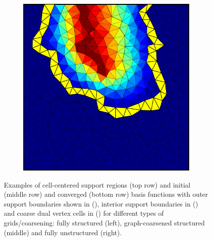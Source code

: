 \begin{figure}[htbp]
\begin{subfigure}[t]{0.3\textwidth}
  \end{subfigure}
  \hfill
  \begin{subfigure}[t]{0.3\textwidth}
    \centerline{\includegraphics[width=0.9\linewidth]{figs/square/square_tria_metis_cell_conv}}
  \end{subfigure}
  \caption[Cell-centered support and basis function examples]{\label{fig:square_cell_basis} Examples of cell-centered support regions (top row) and initial (middle row) and converged (bottom row) basis functions with outer support boundaries shown in (), interior support boundaries in () and coarse dual vertex cells in () for different types of grids/coarsening: fully structured (left), graph-coarsened structured (middle) and fully unstructured (right).}
\end{figure}

